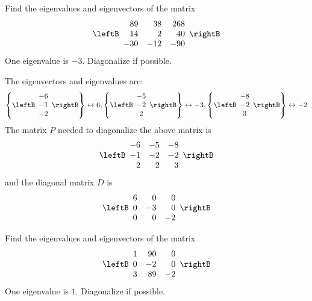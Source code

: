 \begin{enumialphparenastyle}
\begin{ex} Find the eigenvalues and eigenvectors of the matrix 
\begin{equation*}
\leftB
\begin{array}{rrr}
89 & 38 & 268 \\
14 & 2 & 40 \\
-30 & -12 & -90
\end{array}
\rightB
\end{equation*}
One eigenvalue is $-3.$ Diagonalize if possible.
\begin{sol}
The eigenvectors and eigenvalues are:
\[
\left\{ \leftB
\begin{array}{c}
-6 \\
-1 \\
-2
\end{array}
\rightB \right\} \leftrightarrow 6, \left\{ \leftB
\begin{array}{c}
-5 \\
-2 \\
2
\end{array}
\rightB \right\} \leftrightarrow -3, \left\{ \leftB
\begin{array}{c}
-8 \\
-2 \\
3
\end{array}
\rightB \right\} \leftrightarrow -2
\]
The matrix $P$ needed to diagonalize the above matrix is 
\[
\leftB 
\begin{array}{rrr}
-6 & -5 & -8 \\
-1 & -2 & -2 \\
2 & 2 & 3 
\end{array}
\rightB
\]
and the diagonal matrix $D$ is 
\[
\leftB
\begin{array}{rrr}
6 & 0 & 0  \\
0 & -3 & 0 \\
0 & 0 & -2 
\end{array}
\rightB
\]
\end{sol}
\end{ex}

\begin{ex} Find the eigenvalues and eigenvectors of the matrix  
\begin{equation*}
\leftB
\begin{array}{rrr}
1 & 90 & 0 \\
0 & -2 & 0 \\
3 & 89 & -2
\end{array}
\rightB
\end{equation*}
One eigenvalue is $1.$ Diagonalize if possible.
\end{ex}


\end{enumialphparenastyle}
